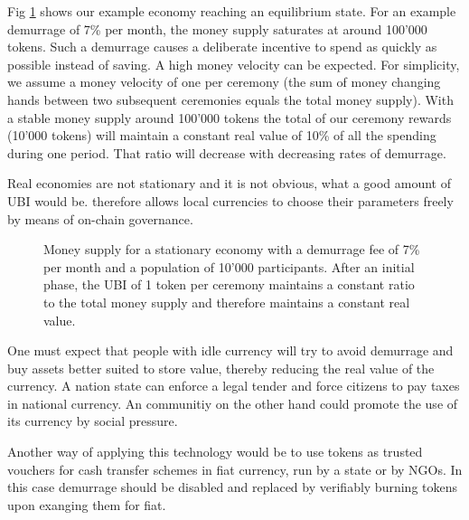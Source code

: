 \documentclass[conference]{IEEEtran}
\begin{document}
Fig \ref{fig:ubi-demurrage} shows our example economy reaching an equilibrium state. For an example demurrage of 7\% per month, the money supply saturates at around 100'000 tokens. Such a demurrage causes a deliberate incentive to spend as quickly as possible instead of saving. A high money velocity can be expected. For simplicity, we assume a money velocity of one per ceremony (the sum of money changing hands between two subsequent ceremonies equals the total money supply). With a stable money supply around 100'000 tokens the total of our ceremony rewards (10'000 tokens) will maintain a constant real value of 10\% of all the spending during one period. That ratio will decrease with decreasing rates of demurrage.

Real economies are not stationary and it is not obvious, what a good amount of UBI would be. \encointer therefore allows local currencies to choose their parameters freely by means of on-chain governance. 

\begin{figure}
	\centering
	\def\svgwidth{\columnwidth}
	
	\caption{Money supply for a stationary economy with a demurrage fee of 7\% per month and a population of 10'000 participants. After an initial phase, the UBI of 1 token per ceremony maintains a constant ratio to the total money supply and therefore maintains a constant real value.}
	\label{fig:ubi-demurrage}
\end{figure}



One must expect that people with idle currency will try to avoid demurrage and buy assets better suited to store value, thereby reducing the real value of the \encointer currency. A nation state can enforce a legal tender and force citizens to pay taxes in national currency. An \encointer communitiy on the other hand could promote the use of its currency by social pressure. 

Another way of applying this technology would be to use \encointer tokens as trusted vouchers for cash transfer schemes in fiat currency, run by a state or by NGOs. In this case demurrage should be disabled and replaced by verifiably burning tokens upon exanging them for fiat.
\end{document}
